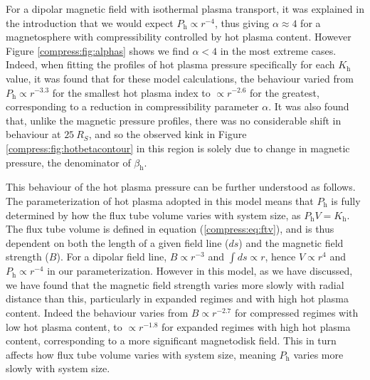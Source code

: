 For a dipolar magnetic field with isothermal plasma transport, it was explained in the introduction that we would expect $P_\mathrm{h} \propto r^{-4}$, thus giving $\alpha \approx 4$ for a magnetosphere with compressibility controlled by hot plasma content. However Figure \ref{compress:fig:alphas} shows we find $\alpha < 4$ in the most extreme cases. Indeed, when fitting the profiles of hot plasma pressure specifically for each $K_\mathrm{h}$ value, it was found that for these model calculations, the behaviour varied from $P_\mathrm{h} \propto r^{-3.3}$ for the smallest hot plasma index to $\propto r^{-2.6}$ for the greatest, corresponding to a reduction in compressibility parameter $\alpha$. It was also found that, unlike the magnetic pressure profiles, there was no considerable shift in behaviour at $\SI{25}{R_S}$, and so the observed kink in Figure \ref{compress:fig:hotbetacontour} in this region is solely due to change in magnetic pressure, the denominator of $\beta_\mathrm{h}$.

This behaviour of the hot plasma pressure can be further understood as follows. The parameterization of hot plasma adopted in this model means that $P_\mathrm{h}$ is fully determined by how the flux tube volume varies with system size, as $P_\mathrm{h}V=K_\mathrm{h}$. The flux tube volume is defined in equation (\ref{compress:eq:ftv}), and is thus dependent on both the length of a given field line ($ds$) and the magnetic field strength ($B$). For a dipolar field line, $B \propto r^{-3}$ and $\int ds \propto r$, hence $V \propto r^4$ and $P_\mathrm{h} \propto r^{-4}$ in our parameterization. However in this model, as we have discussed, we have found that the magnetic field strength varies more slowly with radial distance than this, particularly in expanded regimes and with high hot plasma content. Indeed the behaviour varies from $B \propto r^{-2.7}$ for compressed regimes with low hot plasma content, to $\propto r^{-1.8}$ for expanded regimes with high hot plasma content, corresponding to a more significant magnetodisk field. This in turn affects how flux tube volume varies with system size, meaning $P_\mathrm{h}$ varies more slowly with system size.

